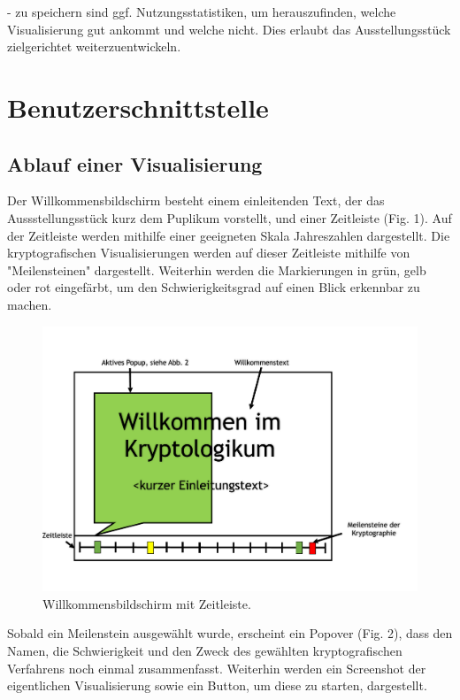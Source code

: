 \documentclass{article}
\begin{document}
- zu speichern sind ggf. Nutzungsstatistiken, um herauszufinden, welche Visualisierung gut ankommt und welche nicht. 
Dies erlaubt das Ausstellungsstück zielgerichtet weiterzuentwickeln.

\section{Benutzerschnittstelle}

\subsection{Ablauf einer Visualisierung}

Der Willkommensbildschirm besteht einem einleitenden Text, der das Aussstellungsstück kurz dem Puplikum vorstellt, und einer Zeitleiste (Fig. 1). Auf der Zeitleiste werden mithilfe einer geeigneten Skala Jahreszahlen dargestellt. Die kryptografischen Visualisierungen werden auf dieser Zeitleiste mithilfe von "Meilensteinen" dargestellt. Weiterhin werden die Markierungen in grün, gelb oder rot eingefärbt, um den Schwierigkeitsgrad auf einen Blick erkennbar zu machen.

\begin{figure}[H]
  \centering
    \includegraphics[width=\textwidth]{resources/ui_walkthrough_start-draft}
  \caption{Willkommensbildschirm mit Zeitleiste.}
\end{figure}

Sobald ein Meilenstein ausgewählt wurde, erscheint ein Popover (Fig. 2), dass den Namen, die Schwierigkeit und den Zweck des gewählten kryptografischen Verfahrens noch einmal zusammenfasst. Weiterhin werden ein Screenshot der eigentlichen Visualisierung sowie ein Button, um diese zu starten, dargestellt.
\end{document}
